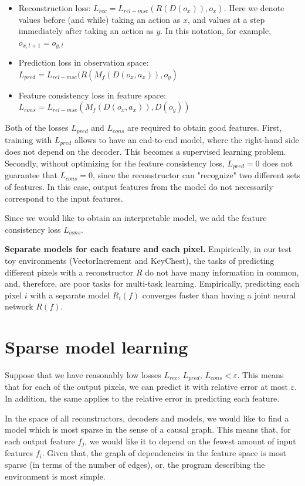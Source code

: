 \documentclass[a4paper,11pt,oneside]{report}
\begin{document}
\begin{itemize}
    \item Reconstruction loss: $L_{rec}=L_{rel-mse}(R(D(o_{x})), o_{x})$. Here we denote values before (and while) taking an action as $x$, and values at a step immediately after taking an action as $y$. In this notation, for example, $o_{x, t+1}=o_{y,t}$
    \item Prediction loss in observation space: $L_{pred}=L_{rel-mse}(R(M_f(D(o_{x}, a_{x})), o_{y})$
    \item Feature consistency loss in feature space: $L_{cons}=L_{rel-mse}(M_f(D(o_x, a_x)), D(o_y))$
\end{itemize}

Both of the losses $L_{pred}$ and $L_{cons}$ are required to obtain good features. First, training with $L_{pred}$ allows to have an end-to-end model, where the right-hand side does not depend on the decoder. This becomes a supervised learning problem. Secondly, without optimizing for the feature consistency loss, $L_{pred}=0$ does not guarantee that $L_{cons}=0$, since the reconstructor can "recognize" two different sets of features. In this case, output features from the model do not necessarily correspond to the input features.

Since we would like to obtain an interpretable model, we add the feature consistency loss $L_{cons}$.

{\bf Separate models for each feature and each pixel.} Empirically, in our test toy environments (VectorIncrement and KeyChest), the tasks of predicting different pixels with a reconstructor $R$ do not have many information in common, and, therefore, are poor tasks for multi-task learning. Empirically, predicting each pixel $i$ with a separate model $R_i(f)$ converges faster than having a joint neural network $R(f)$.

\section{Sparse model learning}
Suppose that we have reasonably low losses $L_{rec},\,L_{pred},\,L_{cons}<\varepsilon$. This means that for each of the output pixels, we can predict it with relative error at most $\varepsilon$. In addition, the same applies to the relative error in predicting each feature.

In the space of all reconstructors, decoders and models, we would like to find a model which is most sparse in the sense of a causal graph. This means that, for each output feature $f_j$, we would like it to depend on the fewest amount of input features $f_i$. Given that, the graph of dependencies in the feature space is most sparse (in terms of the number of edges), or, the program describing the environment is most simple.
\end{document}
